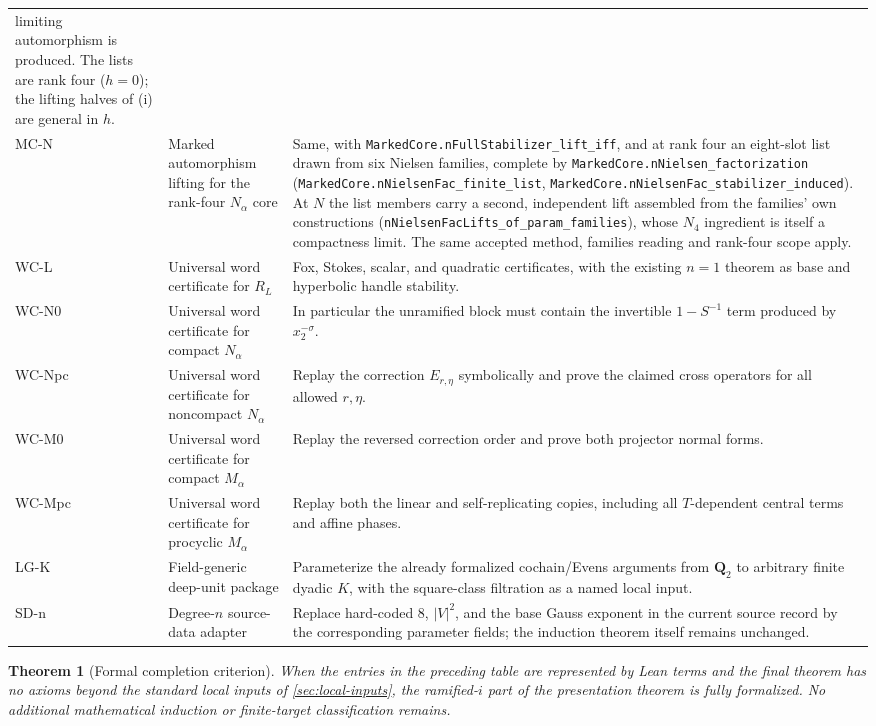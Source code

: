 \documentclass[11pt,reqno]{amsart}
\newtheorem{theorem}{Theorem}[section]
\theoremstyle{remark}
\numberwithin{equation}{section}
\newcommand{\Q}{\mathbf Q}
\begin{document}
\begin{longtable}{>{\raggedright\arraybackslash}p{}
                  >{\raggedright\arraybackslash}p{}
                  >{\raggedright\arraybackslash}p{}}
limiting automorphism is produced.  The lists are rank four (\(h=0\)); the
lifting halves of (i) are general in \(h\).\\
MC-N & Marked automorphism lifting for the rank-four \(N_\alpha\) core &
Same, with \texttt{MarkedCore.\allowbreak nFullStabilizer\_lift\_iff}, and at rank four an
eight-slot list drawn from six Nielsen families, complete by
\texttt{MarkedCore.\allowbreak nNielsen\_factorization}
(\texttt{MarkedCore.\allowbreak nNielsenFac\_finite\_list},
\texttt{MarkedCore.\allowbreak nNielsenFac\_stabilizer\_induced}).  At \(N\) the list
members carry a second, independent lift assembled from the families' own
constructions (\texttt{nNielsenFacLifts\_of\_param\_families}), whose \(N_4\)
ingredient is itself a compactness limit.  The same accepted method, families
reading and rank-four scope apply.\\
WC-L & Universal word certificate for \(R_L\) &
Fox, Stokes, scalar, and quadratic certificates, with the existing
\(n=1\) theorem as base and hyperbolic handle stability.\\
WC-N0 & Universal word certificate for compact \(N_\alpha\) &
In particular the unramified block must contain the invertible
\(1-S^{-1}\) term produced by \(x_2^{-\sigma}\).\\
WC-Npc & Universal word certificate for noncompact \(N_\alpha\) &
Replay the correction \(E_{r,\eta}\) symbolically and prove the claimed
cross operators for all allowed \(r,\eta\).\\
WC-M0 & Universal word certificate for compact \(M_\alpha\) &
Replay the reversed correction order and prove both projector normal
forms.\\
WC-Mpc & Universal word certificate for procyclic \(M_\alpha\) &
Replay both the linear and self-replicating copies, including all
\(T\)-dependent central terms and affine phases.\\
LG-K & Field-generic deep-unit package &
Parameterize the already formalized cochain/Evens arguments from
\(\Q_2\) to arbitrary finite dyadic \(K\), with the square-class
filtration as a named local input.\\
SD-n & Degree-\(n\) source-data adapter &
Replace hard-coded \(8\), \(|V|^2\), and the base Gauss exponent in the
current source record by the corresponding parameter fields; the
induction theorem itself remains unchanged.\\
\bottomrule
\end{longtable}

\begin{theorem}[Formal completion criterion]
When the entries in the preceding table are represented by Lean terms and
the final theorem has no axioms beyond the standard local inputs of
\cref{sec:local-inputs}, the ramified-\(i\) part of the presentation
theorem is fully formalized.  No additional mathematical induction or
finite-target classification remains.
\end{theorem}
\end{document}
